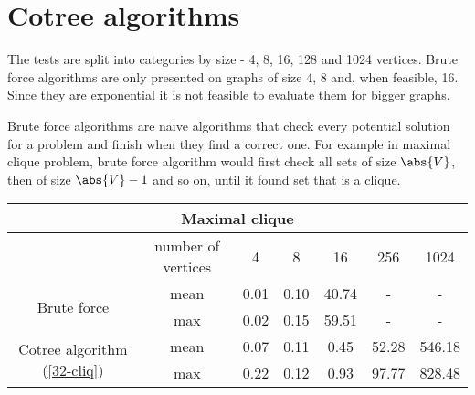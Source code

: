 \section{Cotree algorithms}

The tests are split into categories by size - 4, 8, 16, 128 and 1024  vertices. Brute force algorithms are only presented on graphs of size 4, 8 and, when feasible, 16. Since they are exponential it is not feasible to evaluate them for bigger graphs.

Brute force algorithms are naive algorithms that check every potential solution for a problem and finish when they find a correct one. For example in maximal clique problem, brute force algorithm would first check all sets of size $\abs{V}$, then of size $\abs{V}-1$ and so on, until it found set that is a clique.

\begin{center}
    \begin{tabular}{|c|c|c|c|c|c|c|}
        \hline
        \multicolumn{7}{|c|}{Maximal clique}                                                                          \\
        \hline
                                                          & number of vertices & 4    & 8    & 16    & 256   & 1024   \\
        \hline

        \multirow{2}{*}{Brute force}                      & mean               & 0.01 & 0.10 & 40.74 & -     & -      \\
                                                          & max                & 0.02 & 0.15 & 59.51 & -     & -      \\
        \hline
        \multirow{2}{*}{Cotree algorithm (\ref{32-cliq})} & mean               & 0.07 & 0.11 & 0.45  & 52.28 & 546.18 \\
                                                          & max                & 0.22 & 0.12 & 0.93  & 97.77 & 828.48 \\
        \hline
    \end{tabular}
\end{center}


